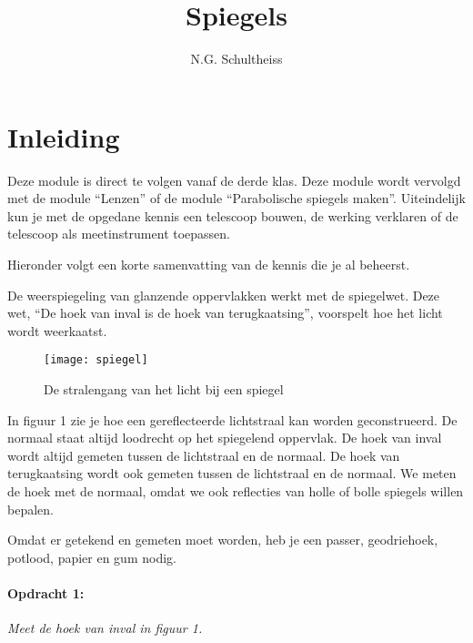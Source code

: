 



\title{Spiegels}
\author{N.G. Schultheiss}
\date{}

\maketitle
\thispagestyle{firststyle}

\section{Inleiding}

Deze module is direct te volgen vanaf de derde klas. Deze module wordt
vervolgd met de module ``Lenzen'' of de module ``Parabolische spiegels
maken''. Uiteindelijk kun je met de opgedane kennis een telescoop
bouwen, de werking verklaren of de telescoop als meetinstrument toepassen. 

Hieronder volgt een korte samenvatting van de kennis die je al beheerst.

De weerspiegeling van glanzende oppervlakken werkt met de spiegelwet.
Deze wet, ``De hoek van inval is de hoek van terugkaatsing'', voorspelt
hoe het licht wordt weerkaatst. 

\begin{figure}[H]
\noindent \begin{centering}
\texttt{[image: spiegel]}
\par\end{centering}

\caption{De stralengang van het licht bij een spiegel}
\end{figure}


In figuur 1 zie je hoe een gereflecteerde lichtstraal kan worden geconstrueerd.
De normaal staat altijd loodrecht op het spiegelend oppervlak. De
hoek van inval wordt altijd gemeten tussen de lichtstraal en de normaal.
De hoek van terugkaatsing wordt ook gemeten tussen de lichtstraal
en de normaal. We meten de hoek met de normaal, omdat we ook reflecties
van holle of bolle spiegels willen bepalen.

Omdat er getekend en gemeten moet worden, heb je een passer, geodriehoek,
potlood, papier en gum nodig.


\paragraph*{Opdracht 1:}

\emph{Meet de hoek van inval in figuur 1.} 


